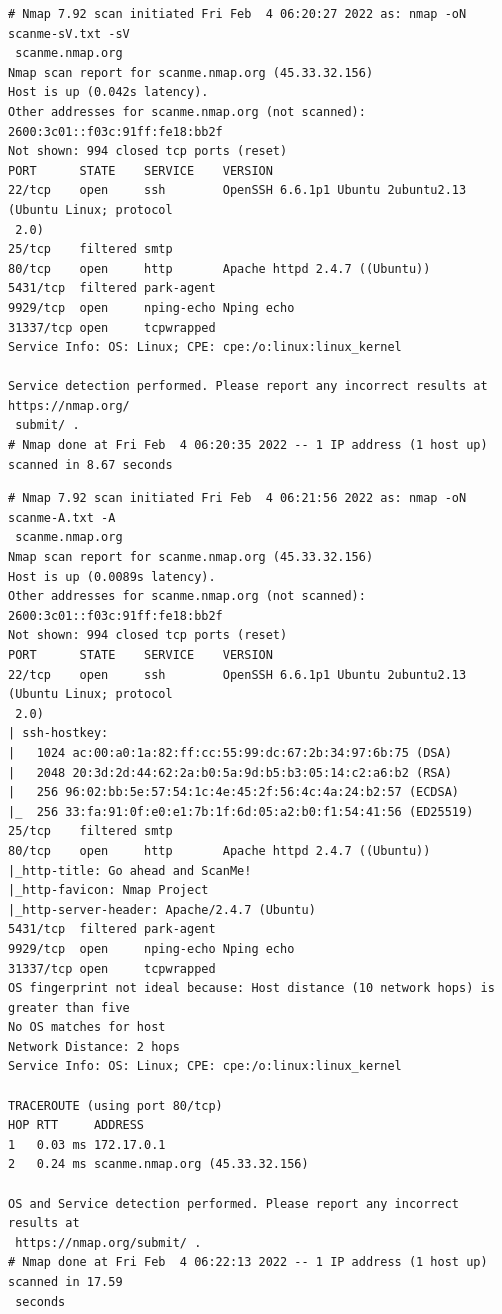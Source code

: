 \documentclass[12pt]{article}
\renewcommand{\footnotesize}{\fontsize{8pt}{10pt}\selectfont}
\begin{document}
\begin{tcolorbox}[colback=CrispBlue!5!white,colframe=CrispBlue!75!black,title=Output of \texttt{nmap -oN scanme-sV.txt -sV scanme.nmap.org}]\footnotesize
\begin{verbatim}
# Nmap 7.92 scan initiated Fri Feb  4 06:20:27 2022 as: nmap -oN scanme-sV.txt -sV
 scanme.nmap.org
Nmap scan report for scanme.nmap.org (45.33.32.156)
Host is up (0.042s latency).
Other addresses for scanme.nmap.org (not scanned): 2600:3c01::f03c:91ff:fe18:bb2f
Not shown: 994 closed tcp ports (reset)
PORT      STATE    SERVICE    VERSION
22/tcp    open     ssh        OpenSSH 6.6.1p1 Ubuntu 2ubuntu2.13 (Ubuntu Linux; protocol
 2.0)
25/tcp    filtered smtp
80/tcp    open     http       Apache httpd 2.4.7 ((Ubuntu))
5431/tcp  filtered park-agent
9929/tcp  open     nping-echo Nping echo
31337/tcp open     tcpwrapped
Service Info: OS: Linux; CPE: cpe:/o:linux:linux_kernel

Service detection performed. Please report any incorrect results at https://nmap.org/
 submit/ .
# Nmap done at Fri Feb  4 06:20:35 2022 -- 1 IP address (1 host up) scanned in 8.67 seconds
\end{verbatim}
\end{tcolorbox}

\begin{tcolorbox}[colback=CrispBlue!5!white,colframe=CrispBlue!75!black,title=Output of \texttt{nmap -oN scanme-A.txt -A scanme.nmap.org}]\footnotesize
\begin{verbatim}
# Nmap 7.92 scan initiated Fri Feb  4 06:21:56 2022 as: nmap -oN scanme-A.txt -A
 scanme.nmap.org
Nmap scan report for scanme.nmap.org (45.33.32.156)
Host is up (0.0089s latency).
Other addresses for scanme.nmap.org (not scanned): 2600:3c01::f03c:91ff:fe18:bb2f
Not shown: 994 closed tcp ports (reset)
PORT      STATE    SERVICE    VERSION
22/tcp    open     ssh        OpenSSH 6.6.1p1 Ubuntu 2ubuntu2.13 (Ubuntu Linux; protocol
 2.0)
| ssh-hostkey: 
|   1024 ac:00:a0:1a:82:ff:cc:55:99:dc:67:2b:34:97:6b:75 (DSA)
|   2048 20:3d:2d:44:62:2a:b0:5a:9d:b5:b3:05:14:c2:a6:b2 (RSA)
|   256 96:02:bb:5e:57:54:1c:4e:45:2f:56:4c:4a:24:b2:57 (ECDSA)
|_  256 33:fa:91:0f:e0:e1:7b:1f:6d:05:a2:b0:f1:54:41:56 (ED25519)
25/tcp    filtered smtp
80/tcp    open     http       Apache httpd 2.4.7 ((Ubuntu))
|_http-title: Go ahead and ScanMe!
|_http-favicon: Nmap Project
|_http-server-header: Apache/2.4.7 (Ubuntu)
5431/tcp  filtered park-agent
9929/tcp  open     nping-echo Nping echo
31337/tcp open     tcpwrapped
OS fingerprint not ideal because: Host distance (10 network hops) is greater than five
No OS matches for host
Network Distance: 2 hops
Service Info: OS: Linux; CPE: cpe:/o:linux:linux_kernel

TRACEROUTE (using port 80/tcp)
HOP RTT     ADDRESS
1   0.03 ms 172.17.0.1
2   0.24 ms scanme.nmap.org (45.33.32.156)

OS and Service detection performed. Please report any incorrect results at
 https://nmap.org/submit/ .
# Nmap done at Fri Feb  4 06:22:13 2022 -- 1 IP address (1 host up) scanned in 17.59
 seconds
\end{verbatim}
\end{tcolorbox}
\end{document}
